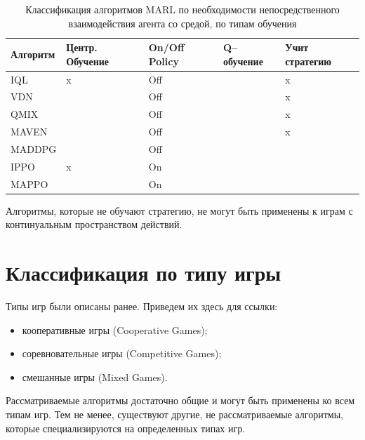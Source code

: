 \begin{table}[H]
	\centering
	\caption{Классификация алгоритмов MARL по необходимости непосредственного взаимодействия агента со средой, по типам обучения}
	\label{classification}
	\begin{tabular}{@{}|l|l|l|l|l|@{}}
	\toprule
	Алгоритм & Центр. Обучение & On/Off Policy & Q--обучение     & Учит стратегию \\ \midrule
	IQL      & x          	   & Off           & \checkmark     & x             \\
	VDN      & \checkmark      & Off           & \checkmark     & x              \\
	QMIX     & \checkmark      & Off           & \checkmark     & x              \\
	MAVEN    & \checkmark      & Off           & \checkmark     & x              \\
	MADDPG   & \checkmark      & Off           & \checkmark     & \checkmark     \\
	IPPO     & x  		       & On            & \checkmark     & \checkmark     \\
	MAPPO    & \checkmark      & On            & \checkmark     & \checkmark     \\
	\bottomrule
	\end{tabular}
\end{table}

Алгоритмы, которые не обучают стратегию, не могут быть применены к играм с континуальным пространством действий. 


\section{Классификация по типу игры}

Типы игр были описаны ранее. Приведем их здесь для ссылки:
\begin{itemize}[label=---]
	\item кооперативные игры (Cooperative Games);
	\item соревновательные игры (Competitive Games);
	\item смешанные игры (Mixed Games).
\end{itemize}

Рассматриваемые алгоритмы достаточно общие и могут быть применены ко всем типам игр.
Тем не менее, существуют другие, не рассматриваемые алгоритмы, которые специализируются на определенных типах игр.

